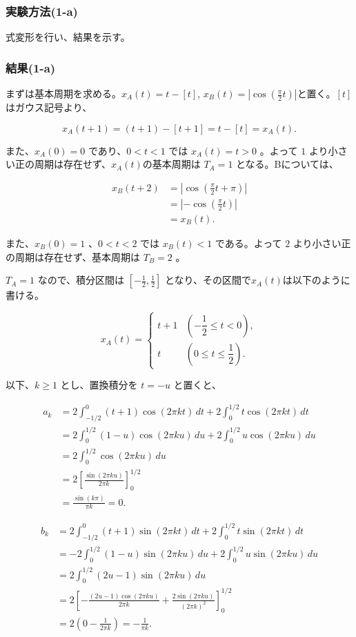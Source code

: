 \documentclass[a4j]{jarticle}
\begin{document}
\subsubsection{実験方法(1-a)}
式変形を行い、結果を示す。

\subsubsection{結果(1-a)}
まずは基本周期を求める。$x_A(t)=t-[t]$, $x_B(t)=\left|\cos\left(\frac{\pi}{2}t\right)\right|$と置く。$[t]$ はガウス記号より、

\[
x_A(t+1)=(t+1)-[t+1]=t-[t]=x_A(t).
\]

また、$x_A(0)=0$ であり、$0<t<1$ では $x_A(t)=t>0$ 。よって $1$ より小さい正の周期は存在せず、$x_A(t)$の基本周期は \textbf{$T_A=1$} となる。Bについては、

\[
\begin{aligned}
x_B(t+2)
&=\left|\cos\left(\frac{\pi}{2}t+\pi\right)\right|\\
&=\left|-\cos\left(\frac{\pi}{2}t\right)\right|\\
&=x_B(t).
\end{aligned}
\]

また、$x_B(0)=1$ 、$0<t<2$ では $x_B(t)<1$ である。よって $2$ より小さい正の周期は存在せず、基本周期は \textbf{$T_B=2$} 。

$T_A=1$ なので、積分区間は $[-\frac12,\frac12]$ となり、その区間で$x_A(t)$は以下のように書ける。

\[
x_A(t)=
\begin{cases}
t+1 & \left(-\dfrac12\le t<0\right),\\[4pt]
t & \left(0\le t\le\dfrac12\right).
\end{cases}
\]

以下、$k\ge 1$ とし、置換積分を $t=-u$ と置くと、

\[
\begin{aligned}
a_k
&=2\int_{-1/2}^{0}(t+1)\cos(2\pi kt)\,dt
  +2\int_0^{1/2}t\cos(2\pi kt)\,dt\\
&=2\int_0^{1/2}(1-u)\cos(2\pi ku)\,du
  +2\int_0^{1/2}u\cos(2\pi ku)\,du\\
&=2\int_0^{1/2}\cos(2\pi ku)\,du\\
&=2\left[\frac{\sin(2\pi ku)}{2\pi k}\right]_0^{1/2}\\
&=\frac{\sin(k\pi)}{\pi k}=0.
\end{aligned}
\]


\[
\begin{aligned}
b_k
&=2\int_{-1/2}^{0}(t+1)\sin(2\pi kt)\,dt
  +2\int_0^{1/2}t\sin(2\pi kt)\,dt\\
&=-2\int_0^{1/2}(1-u)\sin(2\pi ku)\,du
  +2\int_0^{1/2}u\sin(2\pi ku)\,du\\
&=2\int_0^{1/2}(2u-1)\sin(2\pi ku)\,du\\
&=2\left[
  -\frac{(2u-1)\cos(2\pi ku)}{2\pi k}
  +\frac{2\sin(2\pi ku)}{(2\pi k)^2}
  \right]_0^{1/2}\\
&=2\left(0-\frac{1}{2\pi k}\right)
=-\frac{1}{\pi k}.
\end{aligned}
\]
\end{document}
